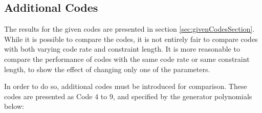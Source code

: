 \subsection{Additional Codes}
The results for the given codes are presented in section \ref{sec:givenCodesSection}. While it is possible to compare the codes, it is not entirely fair to compare codes with both varying code rate and constraint length. It is more reasonable to compare the performance of codes with the same code rate or same constraint length, to show the effect of changing only one of the parameters.




In order to do so, additional codes must be introduced for comparison. These codes are presented as Code 4 to 9, and specified by the generator polynomials below:


